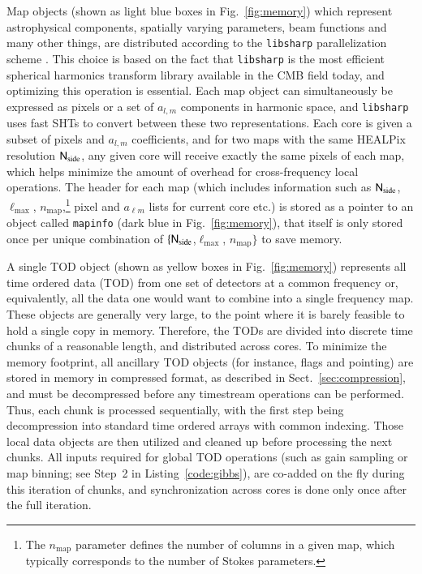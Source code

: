 \documentclass[twocolumn]{aa}
\newcommand{\N}[0]{\tens{N}}
\begin{document}
Map objects (shown as light blue boxes in Fig.~\ref{fig:memory}) which
represent astrophysical components, spatially varying parameters, beam
functions and many other things, are distributed according to the
\texttt{libsharp} parallelization scheme \citep{libsharp}. This choice
is based on the fact that \texttt{libsharp} is the most efficient
spherical harmonics transform library available in the CMB field
today, and optimizing this operation is essential. Each map object can
simultaneously be expressed as pixels or a set of $a_{l,m}$ components
in harmonic space, and \texttt{libsharp} uses fast SHTs to convert
between these two representations. Each core is given a subset of
pixels and $a_{l,m}$ coefficients, and for two maps with the same
HEALPix resolution $\N_{\mathrm{side}}$, any given core will receive
exactly the same pixels of each map, which helps minimize the amount
of overhead for cross-frequency local operations. The header for each
map (which includes information such as $\N_{\mathrm{side}}$,
$\ell_{\mathrm{max}}$, $n_{\mathrm{map}}$,\footnote{The
  $n_{\mathrm{map}}$ parameter defines the number of columns in a
  given map, which typically corresponds to the number of Stokes
  parameters.} pixel and $a_{\ell m}$ lists for current core etc.) is
stored as a pointer to an object called \texttt{mapinfo} (dark blue in Fig.~\ref{fig:memory}), that itself
is only stored once per unique combination of
$\{\N_{\mathrm{side}}$,$\ell_{\mathrm{max}}$, $n_{\mathrm{map}}\}$ to
save memory.

A single TOD object (shown as yellow boxes in Fig.~\ref{fig:memory})
represents all time ordered data (TOD) from one set of detectors at a common
frequency or, equivalently, all the data one would want to combine
into a single frequency map. These objects are generally very large,
to the point where it is barely feasible to hold a single copy in
memory. Therefore, the TODs are divided into discrete time chunks of a
reasonable length, and distributed across cores. To minimize the
memory footprint, all ancillary TOD objects (for instance, flags and
pointing) are stored in memory in compressed format, as described in
Sect.~\ref{sec:compression}, and must be decompressed before any
timestream operations can be performed. Thus, each chunk is processed
sequentially, with the first step being decompression into standard
time ordered arrays with common indexing. Those local data objects are
then utilized and cleaned up before processing the next chunks. All
inputs required for global TOD operations (such as gain sampling or
map binning; see Step~2 in Listing~\ref{code:gibbs}), are co-added on the
fly during this iteration of chunks, and synchronization across cores
is done only once after the full iteration.
\end{document}
